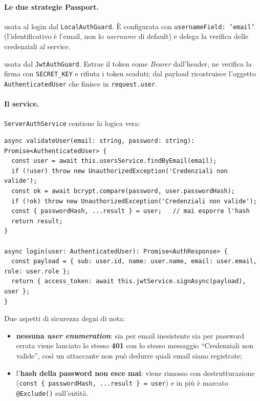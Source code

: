 \documentclass[11pt,a4paper,oneside]{report}
\newcommand{\code}[1]{\texttt{\small #1}}
\newcommand{\file}[1]{\texttt{\small #1}}
\begin{document}
\paragraph{Le due strategie Passport.}
\begin{description}[leftmargin=1.6em,style=nextline]
  \item[\code{LocalStrategy}] usata al login dal \code{LocalAuthGuard}. È
        configurata con \code{usernameField: 'email'} (l'identificativo è
        l'email, non lo \emph{username} di default) e delega la verifica delle
        credenziali al service.
  \item[\code{JwtStrategy}] usata dal \code{JwtAuthGuard}. Estrae il token come
        \emph{Bearer} dall'header, ne verifica la firma con \code{SECRET\_KEY} e
        rifiuta i token scaduti; dal payload ricostruisce l'oggetto
        \code{AuthenticatedUser} che finisce in \code{request.user}.
\end{description}

\paragraph{Il service.} \code{ServerAuthService} contiene la logica vera:

\begin{lstlisting}[caption={\file{auth.service.ts} (estratto).}]
async validateUser(email: string, password: string): Promise<AuthenticatedUser> {
  const user = await this.usersService.findByEmail(email);
  if (!user) throw new UnauthorizedException('Credenziali non valide');
  const ok = await bcrypt.compare(password, user.passwordHash);
  if (!ok) throw new UnauthorizedException('Credenziali non valide');
  const { passwordHash, ...result } = user;   // mai esporre l'hash
  return result;
}

async login(user: AuthenticatedUser): Promise<AuthResponse> {
  const payload = { sub: user.id, name: user.name, email: user.email, role: user.role };
  return { access_token: await this.jwtService.signAsync(payload), user };
}
\end{lstlisting}

Due aspetti di sicurezza degni di nota:
\begin{itemize}[leftmargin=1.4em]
  \item \textbf{nessuna \emph{user enumeration}}: sia per email inesistente sia
        per password errata viene lanciato lo stesso \textbf{401} con lo stesso
        messaggio ``Credenziali non valide'', così un attaccante non può dedurre
        quali email siano registrate;
  \item l'\textbf{hash della password non esce mai}: viene rimosso con
        destrutturazione (\code{const \{ passwordHash, ...result \} = user}) e in
        più è marcato \code{@Exclude()} sull'entità.
\end{itemize}
\end{document}
